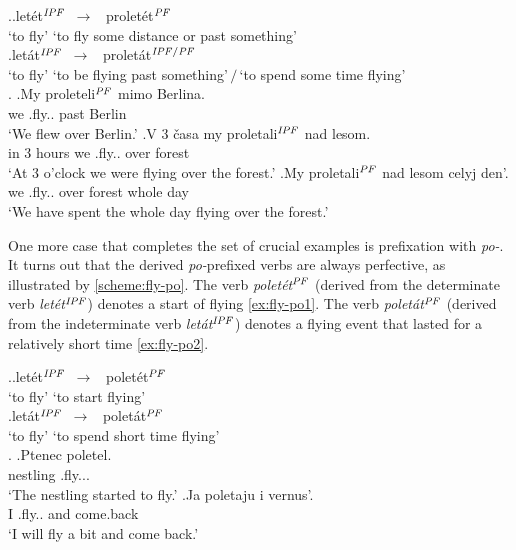 \ex.\label{scheme:fly-pro}\ag.let\'{e}t$^{{\mathit{IPF}}}$~$\to$~ prolet\'{e}t$^{{\mathit{PF}}}$\\
{`to fly'} {`to fly some distance or past something'}\\
\bg.let\'{a}t$^{{\mathit{IPF}}}$~$\to$~ prolet\'{a}t$^{{\mathit{IPF}}/{\mathit{PF}}}$ \\
{`to fly'} {`to be flying past something'\,$/$\,`to spend some time flying'}\\

\ex.\label{ex:fly-pro}
\ag.\label{ex:fly-pro1}My proleteli$^{{\mathit{PF}}}$ mimo Berlina.\\
we .fly.. past Berlin\\
\vspace{0.5em}
`We flew over Berlin.'
\bg.\label{ex:fly-pro2}V 3 \v{c}asa my proletali$^{{\mathit{IPF}}}$ nad lesom.\\
in 3 hours we .fly.. over forest\\
\vspace{0.5em}
`At 3 o'clock we were flying over the forest.'
\bg.\label{ex:fly-pro3}My proletali$^{{\mathit{PF}}}$ nad lesom celyj den'.\\
we .fly.. over forest whole day\\
\vspace{0.5em}
`We have spent the whole day flying over the forest.'

One more case that completes the set of crucial examples is prefixation with \textit{po-}. It turns out that the derived \textit{po-}prefixed verbs are always perfective, as illustrated by \ref{scheme:fly-po}. The verb \textit{polet\'{e}t$^{{\mathit{PF}}}$} (derived from the determinate verb \textit{let\'{e}t$^{{\mathit{IPF}}}$}) denotes a start of flying \ref{ex:fly-po1}. The verb \textit{polet\'{a}t$^{{\mathit{PF}}}$} (derived from the indeterminate verb \textit{let\'{a}t$^{{\mathit{IPF}}}$}) denotes a flying event that lasted for a relatively short time \ref{ex:fly-po2}.

\ex.\label{scheme:fly-po}\ag.let\'{e}t$^{{\mathit{IPF}}}$~$\to$~ polet\'{e}t$^{{\mathit{PF}}}$\\
{`to fly'} {`to start flying'}\\
\bg.let\'{a}t$^{{\mathit{IPF}}}$~$\to$~ polet\'{a}t$^{{\mathit{PF}}}$\\
{`to fly'} {`to spend short time flying'}\\

\ex.\label{ex:fly-po}
\ag.\label{ex:fly-po1}Ptenec poletel.\\
nestling .fly...\\
\vspace{0.5em}
`The nestling started to fly.'
\bg.\label{ex:fly-po2}Ja poletaju i vernus'.\\
I .fly.. and come.back\\
\vspace{0.5em}
`I will fly a bit and come back.'

